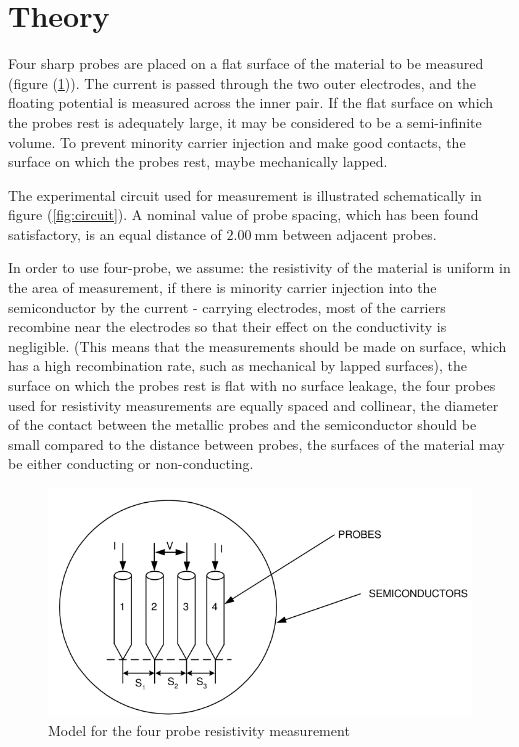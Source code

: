 \documentclass[%
 aip,
 amsmath,amssymb,
 reprint,%
]{revtex4-1}
\begin{document}
\section{Theory}
Four sharp probes are placed on a flat surface of the material to be measured (figure (\ref{fig:model})).
The current is passed through the two outer electrodes, and the floating potential is measured
across the inner pair. If the flat surface on which the probes rest is adequately large, it may be
considered to be a semi-infinite volume. To prevent minority carrier injection and make good
contacts, the surface on which the probes rest, maybe mechanically lapped.

\par
The experimental circuit used for measurement is illustrated schematically in figure (\ref{fig:circuit}).
A nominal value of probe spacing, which has been found satisfactory, is an equal distance of $\SI{2.00}{\milli \metre}$ between adjacent probes.

\par

In order to use four-probe, we assume: the resistivity of the material is uniform in the area of measurement, if there is minority carrier injection into the semiconductor by the current - carrying
electrodes, most of the carriers recombine near the electrodes so that their effect on the
conductivity is negligible. (This means that the measurements should be made on surface,
which has a high recombination rate, such as mechanical by lapped surfaces), the surface on which the probes rest is flat with no surface leakage, the four probes used for resistivity measurements are equally spaced and collinear, the diameter of the contact between the metallic probes and the semiconductor should be small compared to the distance between probes, the surfaces of the material may be either conducting or non-conducting.

\begin{figure}
    \centering
    \includegraphics[scale = 0.57]{Figures/model-for-resistivity.png}
    \caption{Model for the four probe resistivity measurement}
    \label{fig:model}
\end{figure}
\end{document}
